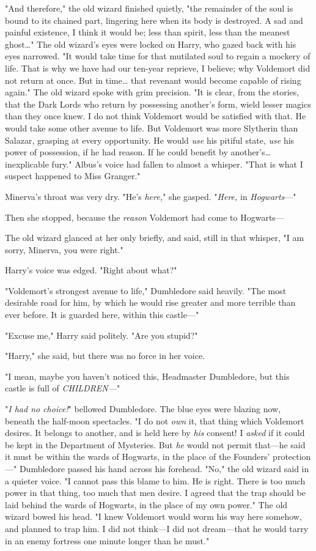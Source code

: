 "And therefore," the old wizard finished quietly, "the remainder of the soul is 
bound to its chained part, lingering here when its body is destroyed. A sad and 
painful existence, I think it would be; less than spirit, less than the meanest 
ghost{\ldots}" The old wizard's eyes were locked on Harry, who gazed back with 
his eyes narrowed. "It would take time for that mutilated soul to regain a 
mockery of life. That is why we have had our ten-year reprieve, I believe; why 
Voldemort did not return at once. But in time{\ldots} that revenant would 
become capable of rising again." The old wizard spoke with grim precision. "It 
is clear, from the stories, that the Dark Lords who return by possessing 
another's form, wield lesser magics than they once knew. I do not think 
Voldemort would be satisfied with that. He would take some other avenue to 
life. But Voldemort was more Slytherin than Salazar, grasping at every 
opportunity. He would \emph{use} his pitiful state, \emph{use} his power of 
possession, if he had reason. If he could benefit by another's{\ldots} 
inexplicable fury." Albus's voice had fallen to almost a whisper. "That is what 
I suspect happened to Miss Granger."

Minerva's throat was very dry. "He's \emph{here,}" she gasped. "\emph{Here,} in 
\emph{Hogwarts}---"

Then she stopped, because the \emph{reason} Voldemort had come to Hogwarts---

The old wizard glanced at her only briefly, and said, still in that whisper, "I 
am sorry, Minerva, you were right."

Harry's voice was edged. "Right about what?"

"Voldemort's strongest avenue to life," Dumbledore said heavily. "The most 
desirable road for him, by which he would rise greater and more terrible than 
ever before. It is guarded here, within this castle---"

"Excuse me," Harry said politely. "Are you stupid?"

"Harry," she said, but there was no force in her voice.

"I mean, maybe you haven't noticed this, Headmaster Dumbledore, but this castle 
is full of \emph{CHILDREN---}"

"\emph{I had no choice!}" bellowed Dumbledore. The blue eyes were blazing now, 
beneath the half-moon spectacles. "I do not \emph{own} it, that thing which 
Voldemort desires. It belongs to another, and is held here by \emph{his} 
consent! I \emph{asked} if it could be kept in the Department of Mysteries. But 
\emph{he} would not permit that---he said it must be within the wards of 
Hogwarts, in the place of the Founders' protection---" Dumbledore passed his 
hand across his forehead. "No," the old wizard said in a quieter voice. "I 
cannot pass this blame to him. He is right. There is too much power in that 
thing, too much that men desire. I agreed that the trap should be laid behind 
the wards of Hogwarts, in the place of my own power." The old wizard bowed his 
head. "I knew Voldemort would worm his way here somehow, and planned to trap 
him. I did not think---I did not dream---that he would tarry in an enemy 
fortress one minute longer than he must."

